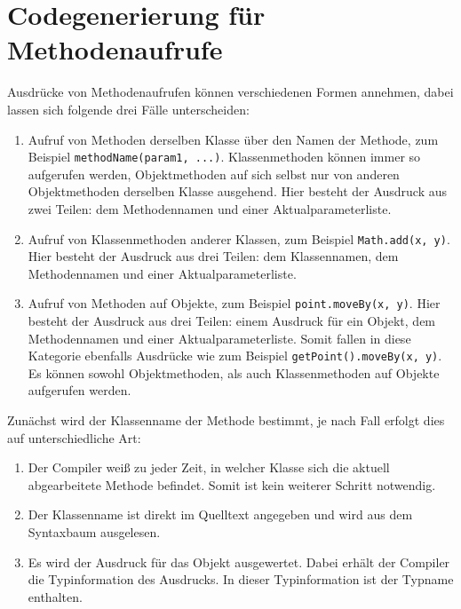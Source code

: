 

\section{Codegenerierung für Methodenaufrufe}
\label{sec:Codegenerierung-für-Methodenaufrufe}

Ausdrücke von Methodenaufrufen können verschiedenen Formen annehmen, dabei lassen sich folgende drei Fälle unterscheiden:
\begin{enumerate}
    \item Aufruf von Methoden derselben Klasse über den Namen der Methode, zum Beispiel \lstinline{methodName(param1, ...)}. Klassenmethoden können immer so aufgerufen werden, Objektmethoden auf sich selbst nur von anderen Objektmethoden derselben Klasse ausgehend. Hier besteht der Ausdruck aus zwei Teilen: dem Methodennamen und einer Aktualparameterliste.
    \item Aufruf von Klassenmethoden anderer Klassen, zum Beispiel \lstinline{Math.add(x, y)}. Hier besteht der Ausdruck aus drei Teilen: dem Klassennamen, dem Methodennamen und einer Aktualparameterliste.
    \item Aufruf von Methoden auf Objekte, zum Beispiel \lstinline{point.moveBy(x, y)}. Hier besteht der Ausdruck aus drei Teilen: einem Ausdruck für ein Objekt, dem Methodennamen und einer Aktualparameterliste. Somit fallen in diese Kategorie ebenfalls Ausdrücke wie zum Beispiel \lstinline{getPoint().moveBy(x, y)}. Es können sowohl Objektmethoden, als auch Klassenmethoden auf Objekte aufgerufen werden.
\end{enumerate}

Zunächst wird der Klassenname der Methode bestimmt, je nach Fall erfolgt dies auf unterschiedliche Art:
\begin{enumerate}
    \item Der Compiler weiß zu jeder Zeit, in welcher Klasse sich die aktuell abgearbeitete Methode befindet. Somit ist kein weiterer Schritt notwendig.
    \item Der Klassenname ist direkt im Quelltext angegeben und wird aus dem Syntaxbaum ausgelesen.
    \item Es wird der Ausdruck für das Objekt ausgewertet. Dabei erhält der Compiler die Typinformation des Ausdrucks. In dieser Typinformation ist der Typname enthalten.
\end{enumerate}

